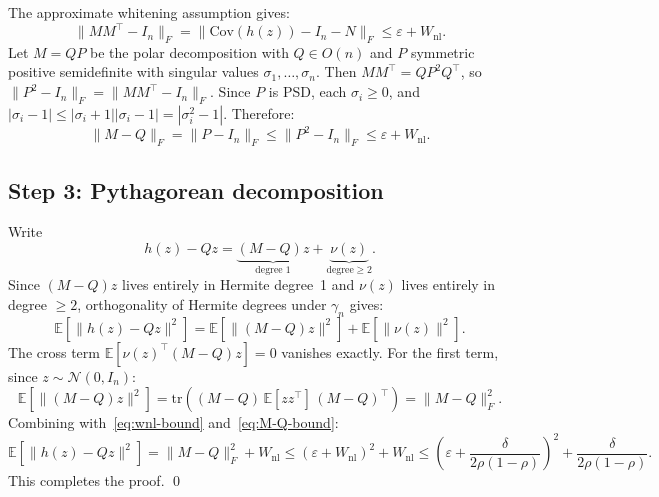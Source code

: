 The approximate whitening assumption gives:
\begin{equation}
    \|MM^\top - I_n\|_F
    = \|\mathrm{Cov}(h(z)) - I_n - N\|_F
    \leq \varepsilon + W_{\mathrm{nl}}.
\end{equation}
Let $M = QP$ be the polar decomposition with $Q \in O(n)$ and $P$ symmetric
positive semidefinite with singular values $\sigma_1, \ldots, \sigma_n$.
Then $MM^\top = QP^2Q^\top$, so
$\|P^2 - I_n\|_F = \|MM^\top - I_n\|_F$.
Since $P$ is PSD, each $\sigma_i \geq 0$, and
$|\sigma_i - 1| \leq |\sigma_i + 1||\sigma_i - 1| = |\sigma_i^2 - 1|$.
Therefore:
\begin{equation}\label{eq:M-Q-bound}
    \|M - Q\|_F = \|P - I_n\|_F \leq \|P^2 - I_n\|_F
    \leq \varepsilon + W_{\mathrm{nl}}.
\end{equation}
 
\subsection{Step 3: Pythagorean decomposition}
 
Write
\begin{equation}
    h(z) - Qz = \underbrace{(M - Q)z}_{\text{degree 1}} + \underbrace{\nu(z)}_{\text{degree} \geq 2}.
\end{equation}
Since $(M-Q)z$ lives entirely in Hermite degree~1 and $\nu(z)$ lives entirely
in degree $\geq 2$, orthogonality of Hermite degrees under $\gamma_n$ gives:
\begin{equation}
    \mathbb{E}[\|h(z) - Qz\|^2]
    = \mathbb{E}[\|(M-Q)z\|^2] + \mathbb{E}[\|\nu(z)\|^2].
\end{equation}
The cross term $\mathbb{E}[\nu(z)^\top (M-Q)z] = 0$ vanishes exactly.
For the first term, since $z \sim \mathcal{N}(0, I_n)$:
\begin{equation}
    \mathbb{E}[\|(M-Q)z\|^2]
    = \mathrm{tr}\!\left((M-Q)\,\mathbb{E}[zz^\top]\,(M-Q)^\top\right)
    = \|M - Q\|_F^2.
\end{equation}
Combining with~\eqref{eq:wnl-bound} and~\eqref{eq:M-Q-bound}:
\begin{equation}
    \mathbb{E}[\|h(z) - Qz\|^2]
    = \|M - Q\|_F^2 + W_{\mathrm{nl}}
    \leq (\varepsilon + W_{\mathrm{nl}})^2 + W_{\mathrm{nl}}
    \leq \left(\varepsilon + \frac{\delta}{2\rho(1-\rho)}\right)^{\!2}
    + \frac{\delta}{2\rho(1-\rho)}.
\end{equation}
This completes the proof. \qed

